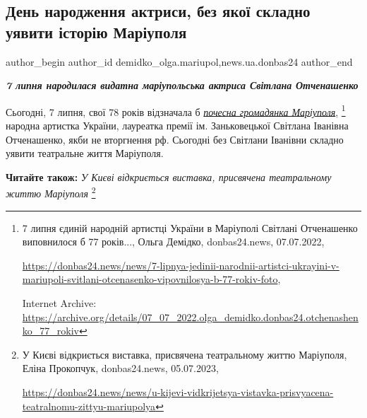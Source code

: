  
 
 
 
 
 
\subsection{День народження актриси, без якої складно уявити історію Маріуполя}
\label{sec:07_07_2023.stz.news.ua.donbas24.1.svitlana_otchenashenko_birthday}
 
\ifcmt
 author_begin
   author_id demidko_olga.mariupol,news.ua.donbas24
 author_end
\fi


\begin{center}
  \em\color{blue}\bfseries\Large
  7 липня народилася видатна маріупольська актриса Світлана Отченашенко
\end{center}

Сьогодні, 7 липня, свої 78 років відзначала б \href{https://archive.org/details/07_07_2022.olga_demidko.donbas24.otchenashenko_77_rokiv}{%
\emph{почесна громадянка Маріуполя}},%
\footnote{7 липня єдиній народній артистці України в Маріуполі Світлані Отченашенко виповнилося б 77 років..., %
Ольга Демідко, donbas24.news, 07.07.2022, \par%
\url{https://donbas24.news/news/7-lipnya-jedinii-narodnii-artistci-ukrayini-v-mariupoli-svitlani-otcenasenko-vipovnilosya-b-77-rokiv-foto}, \par%
Internet Archive: \url{https://archive.org/details/07_07_2022.olga_demidko.donbas24.otchenashenko_77_rokiv}
} %
народна артистка України, лауреатка премії ім. Заньковецької Світлана Іванівна
Отченашенко, якби не вторгнення рф. Сьогодні без Світлани Іванівни складно
уявити театральне життя Маріуполя.

\textbf{Читайте також:} \emph{У Києві відкриється виставка, присвячена театральному життю Маріуполя}%
\footnote{У Києві відкриється виставка, присвячена театральному життю Маріуполя, Еліна Прокопчук, donbas24.news, 05.07.2023, \par%
\url{https://donbas24.news/news/u-kijevi-vidkrijetsya-vistavka-prisvyacena-teatralnomu-zittyu-mariupolya}%
}

